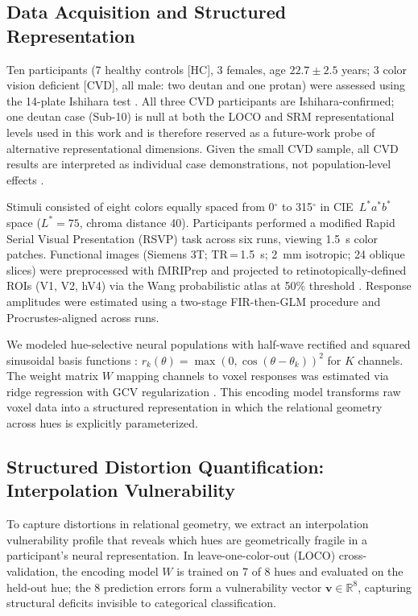 \documentclass{article}
\begin{document}
\subsection{Data Acquisition and Structured Representation}

Ten participants (7 healthy controls [HC], 3 females, age $22.7 \pm 2.5$ years; 3 color vision deficient [CVD], all male: two deutan and one protan) were assessed using the 14-plate Ishihara test \citep{ishihara1917}.
All three CVD participants are Ishihara-confirmed; one deutan case (Sub-10) is null at both the LOCO and SRM representational levels used in this work and is therefore reserved as a future-work probe of alternative representational dimensions.
Given the small CVD sample, all CVD results are interpreted as individual case demonstrations, not population-level effects \citep{crawford1998}.

Stimuli consisted of eight colors equally spaced from 0$^\circ$ to 315$^\circ$ in CIE~$L^*a^*b^*$ space ($L^* = 75$, chroma distance 40).
Participants performed a modified Rapid Serial Visual Presentation (RSVP) task \citep{brouwer2009} across six runs, viewing 1.5~s color patches.
Functional images (Siemens 3T; TR\,=\,1.5~s; 2~mm isotropic; 24 oblique slices) were preprocessed with fMRIPrep and projected to retinotopically-defined ROIs (V1, V2, hV4) via the Wang probabilistic atlas at 50\% threshold \citep{wang2015}.
Response amplitudes were estimated using a two-stage FIR-then-GLM procedure \citep{brouwer2009} and Procrustes-aligned across runs.

We modeled hue-selective neural populations with half-wave rectified and squared sinusoidal basis functions \citep{brouwer2009}: $r_k(\theta) = \max(0, \cos(\theta - \theta_k))^2$ for $K$ channels.
The weight matrix $W$ mapping channels to voxel responses was estimated via ridge regression with GCV regularization \citep{golub1979}.
This encoding model transforms raw voxel data into a structured representation in which the relational geometry across hues is explicitly parameterized.

\subsection{Structured Distortion Quantification: Interpolation Vulnerability}

To capture distortions in relational geometry, we extract an interpolation vulnerability profile that reveals which hues are geometrically fragile in a participant's neural representation.
In leave-one-color-out (LOCO) cross-validation, the encoding model $W$ is trained on 7 of 8 hues and evaluated on the held-out hue; the 8 prediction errors form a vulnerability vector $\mathbf{v} \in \mathbb{R}^8$, capturing structural deficits invisible to categorical classification.
\end{document}
